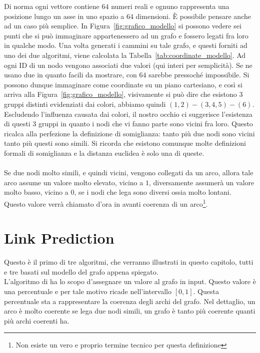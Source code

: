 Di norma ogni vettore contiene $64$ numeri reali e ognuno rappresenta una posizione lungo un asse in uno spazio a $64$ dimensioni. È possibile pensare anche ad un caso più semplice. In Figura~\ref{fig:grafico_modello} si possono vedere sei punti che si può immaginare appartenessero ad un grafo e fossero legati fra loro in qualche modo. Una volta generati i cammini su tale grafo, e questi forniti ad uno dei due algoritmi, viene calcolata la Tabella~\ref{tab:coordinate_modello}. Ad ogni ID di un nodo vengono associati due valori (qui interi per semplicità). Se ne usano due in quanto facili da mostrare, con $64$ sarebbe pressoché impossibile. Si possono dunque immaginare come coordinate su un piano cartesiano, e così si arriva alla Figura~\ref{fig:grafico_modello}, visivamente si può dire che esistono 3 gruppi distinti evidenziati dai colori, abbiamo quindi $(1, 2) - (3, 4, 5) - (6)$.\\
Escludendo l'influenza causata dai colori, il nostro occhio ci suggerisce l'esistenza di questi 3 gruppi in quanto i nodi che vi fanno parte sono vicini fra loro. Questo ricalca alla perfezione la definizione di somiglianza: tanto più due nodi sono vicini tanto più questi sono simili. Si ricorda che esistono comunque molte definizioni formali di somiglianza e la distanza euclidea è solo una di queste.\\
\\
Se due nodi molto simili, e quindi vicini, vengono collegati da un arco, allora tale arco assume un valore molto elevato, vicino a $1$, diversamente assumerà un valore molto basso, vicino a $0$, se i nodi che lega sono diversi ossia molto lontani.\\
Questo valore verrà chiamato d'ora in avanti coerenza di un arco\footnote{Non esiste un vero e proprio termine tecnico per questa definizione}.
%
\section{Link Prediction}
Questo è il primo di tre algoritmi, che verranno illustrati in questo capitolo, tutti e tre basati sul modello del grafo appena spiegato.\\
L'algoritmo di \LPred ha lo scopo d'assegnare un valore al grafo in input. Questo valore è una percentuale e per tale motivo ricade nell'intervallo $[0, 1]$. Questa percentuale sta a rappresentare la coerenza degli archi del grafo. Nel dettaglio, un arco è molto coerente se lega due nodi simili, un grafo è tanto più coerente quanti più archi coerenti ha.
%
